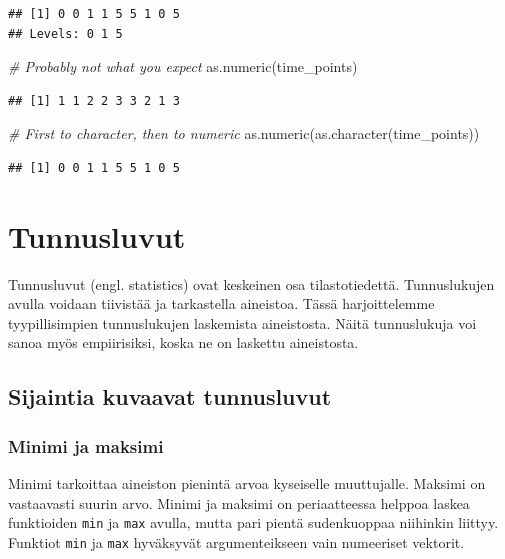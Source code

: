 \documentclass[
]{book}
\newenvironment{Shaded}{\begin{snugshade}}{\end{snugshade}}
\newcommand{\CommentTok}[1]{\textcolor[rgb]{0.56,0.35,0.01}{\textit{#1}}}
\newcommand{\FunctionTok}[1]{\textcolor[rgb]{0.00,0.00,0.00}{#1}}
\newcommand{\NormalTok}[1]{#1}
\begin{document}
\begin{verbatim}
## [1] 0 0 1 1 5 5 1 0 5
## Levels: 0 1 5
\end{verbatim}

\begin{Shaded}
\begin{Highlighting}[]
\CommentTok{\# Probably not what you expect}
\FunctionTok{as.numeric}\NormalTok{(time\_points)}
\end{Highlighting}
\end{Shaded}

\begin{verbatim}
## [1] 1 1 2 2 3 3 2 1 3
\end{verbatim}

\begin{Shaded}
\begin{Highlighting}[]
\CommentTok{\# First to character, then to numeric}
\FunctionTok{as.numeric}\NormalTok{(}\FunctionTok{as.character}\NormalTok{(time\_points))}
\end{Highlighting}
\end{Shaded}

\begin{verbatim}
## [1] 0 0 1 1 5 5 1 0 5
\end{verbatim}

\hypertarget{statistics}{%
\chapter{Tunnusluvut}\label{statistics}}

Tunnusluvut (engl. statistics) ovat keskeinen osa tilastotiedettä. Tunnuslukujen avulla voidaan tiivistää ja tarkastella aineistoa. Tässä harjoittelemme tyypillisimpien tunnuslukujen laskemista aineistosta. Näitä tunnuslukuja voi sanoa myös empiirisiksi, koska ne on laskettu aineistosta.

\hypertarget{sijaintia-kuvaavat-tunnusluvut}{%
\section{Sijaintia kuvaavat tunnusluvut}\label{sijaintia-kuvaavat-tunnusluvut}}

\hypertarget{minimi-ja-maksimi}{%
\subsection{Minimi ja maksimi}\label{minimi-ja-maksimi}}

Minimi tarkoittaa aineiston pienintä arvoa kyseiselle muuttujalle. Maksimi on vastaavasti suurin arvo. Minimi ja maksimi on periaatteessa helppoa laskea funktioiden \texttt{min} ja \texttt{max} avulla, mutta pari pientä sudenkuoppaa niihinkin liittyy. Funktiot \texttt{min} ja \texttt{max} hyväksyvät argumenteikseen vain numeeriset vektorit.
\end{document}
